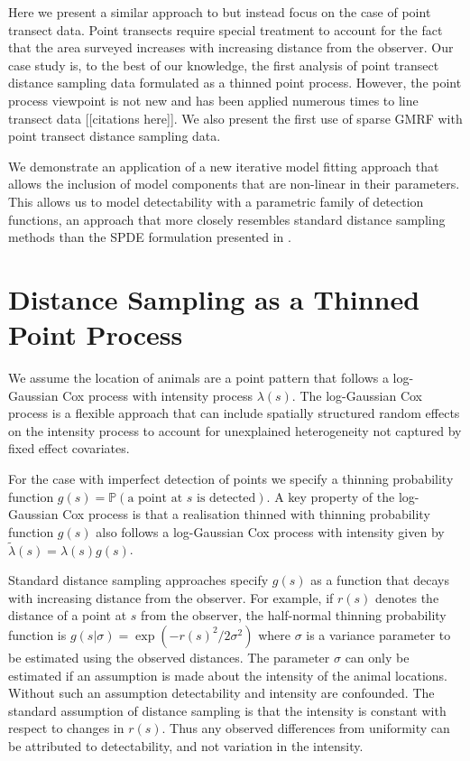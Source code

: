 \documentclass[preprint,12pt]{elsarticle}
\newcommand{\tl}{\tilde{\lambda}}   %
\begin{document}
Here we present a similar approach to \citet{yuan_point_2017} but instead focus on the case of point transect data.  Point transects require special treatment to account for the fact that the area surveyed increases with increasing distance from the observer.  Our case study is, to the best of our knowledge, the first analysis of point transect distance sampling data formulated as a thinned point process.  However, the point process viewpoint is not new and has been applied numerous times to line transect data [[citations here]].  We also present the first use of sparse GMRF with point transect distance sampling data.  

We demonstrate an application of a new iterative model fitting approach that allows the inclusion of model components that are non-linear in their parameters.  This allows us to model detectability with a parametric family of detection functions, an approach that more closely resembles standard distance sampling methods than the SPDE formulation presented in \citet{yuan_point_2017}.  


\section*{Distance Sampling as a Thinned Point Process}

We assume the location of animals are a point pattern that follows a log-Gaussian Cox process with intensity process $\lambda(s)$.  The log-Gaussian Cox process is a flexible approach that can include spatially structured random effects on the intensity process to account for unexplained heterogeneity not captured by fixed effect covariates.

\sloppy For the case with imperfect detection of points we specify a thinning probability function $g(s) = \mathbb{P}(\text{a point at $s$ is detected})$. A key property of the log-Gaussian Cox process is that a realisation thinned with thinning probability function $g(s)$ also follows a log-Gaussian Cox process with intensity given by $\tl(s) = \lambda(s)g(s)$.

Standard distance sampling approaches specify $g(s)$ as a function that decays with increasing distance from the observer.  For example, if $r(s)$ denotes the distance of a point at $s$ from the observer, the half-normal thinning probability function is $g(s | \sigma) = \exp(-r(s)^2 / 2\sigma^2)$ where $\sigma$ is a variance parameter to be estimated using the observed distances.  The parameter $\sigma$ can only be estimated if an assumption is made about the intensity of the animal locations.  Without such an assumption detectability and intensity are confounded.  The standard assumption of distance sampling is that the intensity is constant with respect to changes in $r(s)$.  Thus any observed differences from uniformity can be attributed to detectability, and not variation in the intensity.
\end{document}
